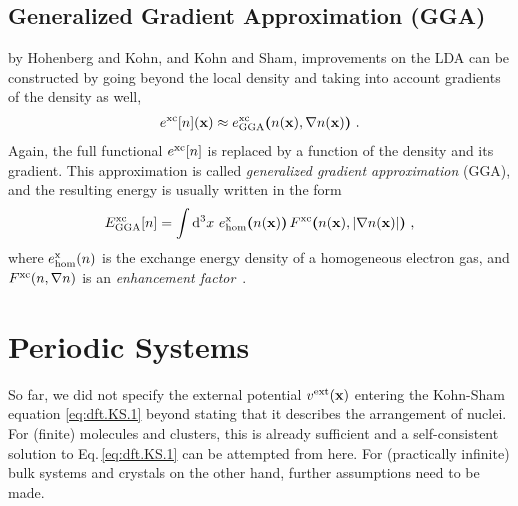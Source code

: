 \subsection{Generalized Gradient Approximation (GGA)}
 by Hohenberg and Kohn, and Kohn and Sham, improvements on the LDA can be constructed by going beyond the local density and taking into account gradients of the density as well,
\begin{align}
	e^{\rm xc} [n] ({\bf x})
		\approx e^{\rm xc}_{\rm GGA} \bm ( n({\bf x}), \nabla n({\bf x}) \bm )~.
	\label{eq:dft.exc.gga.1}
\end{align}
Again, the full functional $e^{\rm xc}[n]$ is replaced by a function of the density and its gradient. This approximation is called \emph{generalized gradient approximation} (GGA), and the resulting energy is usually written in the form
\begin{align}
		E^{\rm xc}_{\rm GGA}[n] 
		= \int \d^3 x ~ e^{\rm x}_{\rm hom} \bm( n ({\bf x}) \bm) \,
			F^{\rm xc} \bm( n ({\bf x}), \lvert \nabla n ({\bf x})\rvert \bm)~,
		\label{eq:dft.GGA.1}
\end{align}
where $e^{\rm x}_{\rm hom}(n)$ is the exchange energy density of a homogeneous electron gas, and $F^{\rm xc}(n, \nabla n)$ is an \emph{enhancement factor}~\cite{Perdew1992}.

\vfill

\section{Periodic Systems}
\label{sec:theory.periodic.1}
So far, we did not specify the external potential $v^{\rm ext} ({\bf x})$ entering the Kohn-Sham equation \eqref{eq:dft.KS.1} beyond stating that it describes the arrangement of nuclei. For (finite) molecules and clusters, this is already sufficient and a self-consistent solution to Eq.\,\eqref{eq:dft.KS.1} can be attempted from here. For (practically infinite) bulk systems and crystals on the other hand, further assumptions need to be made.

